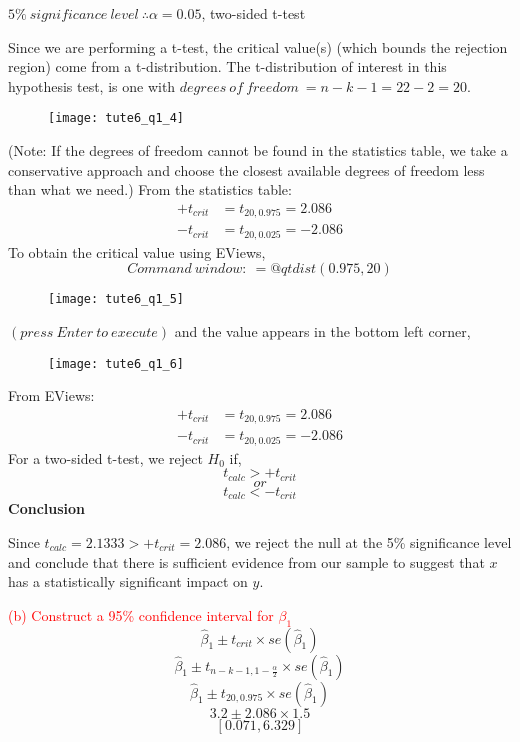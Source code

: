 \documentclass[12pt]{report}
\begin{document}
\noindent $5\%\ significance\ level\ \therefore \alpha = 0.05$, two-sided t-test

\noindent Since we are performing a t-test, the critical value(s) (which bounds the rejection region) come from a t-distribution. The t-distribution of interest in this hypothesis test, is one with $degrees\ of\ freedom\ = n - k - 1 = 22 - 2 = 20$. 


\begin{figure}[H]
	\centering
	\texttt{[image: tute6\_q1\_4]}
\end{figure}
\vspace{-\baselineskip} \noindent (Note: If the degrees of freedom cannot be found in the statistics table, we take a conservative approach and choose the closest available degrees of freedom less than what we need.)
\noindent From the statistics table: \begin{align*}
	+t_{crit} &= t_{20,0.975} = 2.086 \\
	-t_{crit} &= t_{20,0.025} = -2.086
\end{align*}
\noindent To obtain the critical value using EViews,
$$Command\ window:\ =@qtdist(0.975,20)$$
\begin{figure}[H]
	\centering
	\texttt{[image: tute6\_q1\_5]}
\end{figure}
\vspace{-\baselineskip}\centering $(press\ Enter\ to\ execute)$
\justify and the value appears in the bottom left corner,
\begin{figure}[H]
	\centering
	\texttt{[image: tute6\_q1\_6]}
\end{figure}
\vspace{-\baselineskip}
\noindent From EViews: \begin{align*}
+t_{crit} &= t_{20,0.975} = 2.086 \\
-t_{crit} &= t_{20,0.025} = -2.086
\end{align*}
\noindent For a two-sided t-test, we reject $H_0$ if,
$$t_{calc} > +t_{crit}$$
$$or$$
$$t_{calc} < -t_{crit}$$
\noindent \textbf{Conclusion}

\noindent Since $t_{calc} = 2.1333 > +t_{crit} = 2.086$, we reject the null at the 5\% significance level and conclude that there is sufficient evidence from our sample to suggest that $x$ has a statistically significant impact on $y$.

\newpage
\noindent \textcolor{red}{(b) Construct a 95\% confidence interval for $\beta_1$}
$$\hat{\beta}_1 \pm t_{crit} \times se(\hat{\beta}_1)$$
$$\hat{\beta}_1 \pm t_{n-k-1,1-\frac{\alpha}{2}} \times se(\hat{\beta}_1)$$
$$\hat{\beta}_1 \pm t_{20,0.975} \times se(\hat{\beta}_1)$$
$$3.2 \pm 2.086 \times 1.5$$
$$[0.071,6.329]$$
\end{document}
